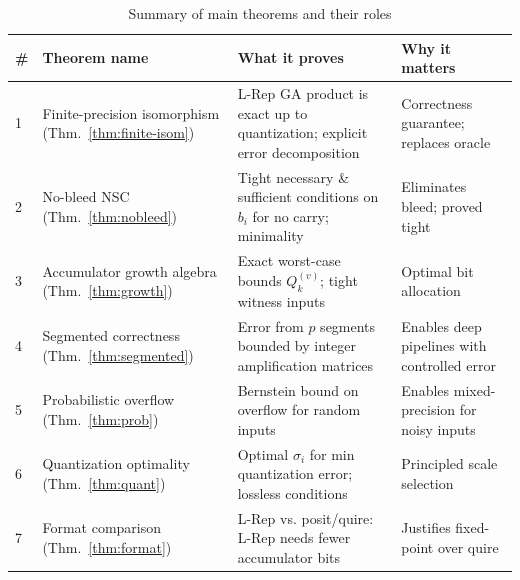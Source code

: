 \documentclass[11pt,a4paper]{article}
\theoremstyle{definition}
\theoremstyle{plain}
\theoremstyle{remark}
\begin{document}
\begin{table}[h]
\centering
\caption{Summary of main theorems and their roles}
\small
\begin{tabular}{p{0.5cm}p{4cm}p{4.5cm}p{3.5cm}}
\toprule
\# & Theorem name & What it proves & Why it matters \\
\midrule
1 & Finite-precision isomorphism (Thm.~\ref{thm:finite-isom}) & L-Rep GA product is exact up to quantization; explicit error decomposition & Correctness guarantee; replaces oracle \\
2 & No-bleed NSC (Thm.~\ref{thm:nobleed}) & Tight necessary \& sufficient conditions on $b_i$ for no carry; minimality & Eliminates bleed; proved tight \\
3 & Accumulator growth algebra (Thm.~\ref{thm:growth}) & Exact worst-case bounds $Q_k^{(v)}$; tight witness inputs & Optimal bit allocation \\
4 & Segmented correctness (Thm.~\ref{thm:segmented}) & Error from $p$ segments bounded by integer amplification matrices & Enables deep pipelines with controlled error \\
5 & Probabilistic overflow (Thm.~\ref{thm:prob}) & Bernstein bound on overflow for random inputs & Enables mixed-precision for noisy inputs \\
6 & Quantization optimality (Thm.~\ref{thm:quant}) & Optimal $\sigma_i$ for min quantization error; lossless conditions & Principled scale selection \\
7 & Format comparison (Thm.~\ref{thm:format}) & L-Rep vs. posit/quire: L-Rep needs fewer accumulator bits & Justifies fixed-point over quire \\
\bottomrule
\end{tabular}
\end{table}
\end{document}
